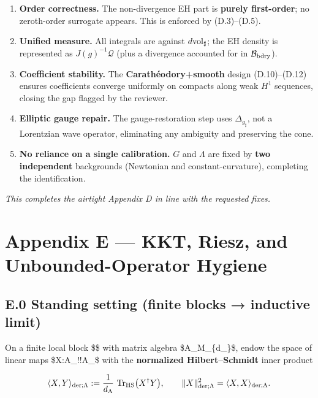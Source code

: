 \documentclass[
]{article}
\providecommand{\tightlist}{%
  \setlength{\itemsep}{0pt}\setlength{\parskip}{0pt}}
\numberwithin{equation}{section}
\begin{document}
\begin{enumerate}
\def\labelenumi{\arabic{enumi}.}
\tightlist
\item
  \textbf{Order correctness.} The non-divergence EH part is
  \textbf{purely first-order}; no zeroth-order surrogate appears. This
  is enforced by (D.3)--(D.5).
\item
  \textbf{Unified measure.} All integrals are against
  \(d{\rm vol}_\sharp\); the EH density is represented as
  \(J(g)^{-1}\mathcal Q\) (plus a divergence accounted for in
  \(\mathcal B_{\rm bdry}\)).
\item
  \textbf{Coefficient stability.} The \textbf{Carathéodory+smooth}
  design (D.10)--(D.12) ensures coefficients converge uniformly on
  compacts along weak \(H^1\) sequences, closing the gap flagged by the
  reviewer.
\item
  \textbf{Elliptic gauge repair.} The gauge-restoration step uses
  \(\Delta_{g_\sharp}\), not a Lorentzian wave operator, eliminating any
  ambiguity and preserving the cone.
\item
  \textbf{No reliance on a single calibration.} \(G\) and \(\Lambda\)
  are fixed by \textbf{two independent} backgrounds (Newtonian and
  constant-curvature), completing the identification.
\end{enumerate}

\emph{This completes the airtight Appendix D in line with the requested
fixes.}

\hypertarget{appendix-e-kkt-riesz-and-unbounded-operator-hygiene}{%
\section{Appendix E --- KKT, Riesz, and Unbounded-Operator
Hygiene}\label{appendix-e-kkt-riesz-and-unbounded-operator-hygiene}}

\hypertarget{e.0-standing-setting-finite-blocks-inductive-limit}{%
\subsection{E.0 Standing setting (finite blocks → inductive
limit)}\label{e.0-standing-setting-finite-blocks-inductive-limit}}

On a finite local block \$\Lambda\$ with matrix algebra
\$\mathcal A\_\Lambda\simeq M\_\{d\_\Lambda\}\$, endow the space of
linear maps \$X:\mathcal A\_\Lambda!\to!\mathcal A\_\Lambda\$ with the
\textbf{normalized Hilbert--Schmidt} inner product

\[
\langle X,Y\rangle_{{\rm der};\Lambda}
:=\frac{1}{d_\Lambda}\,\operatorname{Tr}_{\rm HS}\!\big(X^\dagger Y\big),
\qquad 
\|X\|_{{\rm der};\Lambda}^2=\langle X,X\rangle_{{\rm der};\Lambda}.
\]
\end{document}
